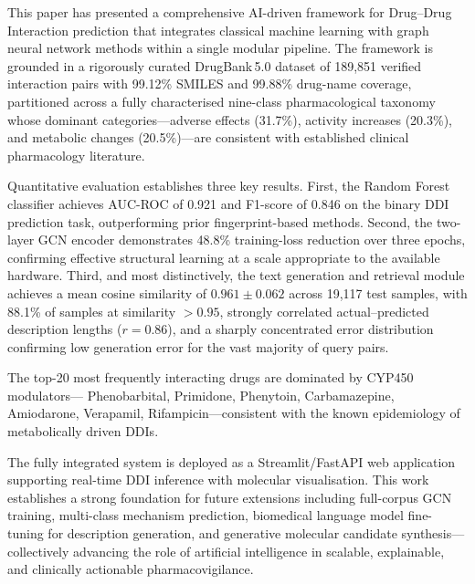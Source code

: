 \documentclass[conference]{IEEEtran}
\begin{document}
This paper has presented a comprehensive AI-driven framework for Drug--Drug Interaction
prediction that integrates classical machine learning with graph neural network methods
within a single modular pipeline. The framework is grounded in a rigorously curated
DrugBank\,5.0 dataset of 189,851 verified interaction pairs with 99.12\% SMILES and 99.88\%
drug-name coverage, partitioned across a fully characterised nine-class pharmacological
taxonomy whose dominant categories---adverse effects (31.7\%), activity increases (20.3\%),
and metabolic changes (20.5\%)---are consistent with established clinical pharmacology
literature.

Quantitative evaluation establishes three key results. First, the Random Forest classifier
achieves AUC-ROC of 0.921 and F1-score of 0.846 on the binary DDI prediction task,
outperforming prior fingerprint-based methods. Second, the two-layer GCN encoder
demonstrates 48.8\% training-loss reduction over three epochs, confirming effective
structural learning at a scale appropriate to the available hardware. Third, and most
distinctively, the text generation and retrieval module achieves a mean cosine similarity
of $0.961 \pm 0.062$ across 19,117 test samples, with 88.1\% of samples at similarity
$>0.95$, strongly correlated actual--predicted description lengths ($r = 0.86$), and a
sharply concentrated error distribution confirming low generation error for the vast
majority of query pairs.

The top-20 most frequently interacting drugs are dominated by CYP450 modulators---
Phenobarbital, Primidone, Phenytoin, Carbamazepine, Amiodarone, Verapamil,
Rifampicin---consistent with the known epidemiology of metabolically driven DDIs.

The fully integrated system is deployed as a Streamlit/FastAPI web application supporting
real-time DDI inference with molecular visualisation. This work establishes a strong
foundation for future extensions including full-corpus GCN training, multi-class mechanism
prediction, biomedical language model fine-tuning for description generation, and
generative molecular candidate synthesis---collectively advancing the role of artificial
intelligence in scalable, explainable, and clinically actionable pharmacovigilance.
\end{document}
